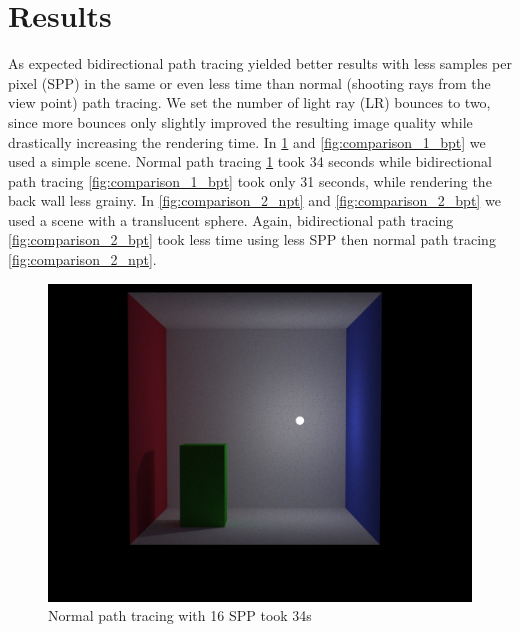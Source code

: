 \section{Results}
As expected bidirectional path tracing yielded better results with less samples per pixel (SPP) in the same or even less time than normal (shooting rays from the view point) path tracing. We set the number of light ray (LR) bounces to two, since more bounces only slightly improved the resulting image quality while drastically increasing the rendering time. In \ref{fig:comparison_1_npt} and \ref{fig:comparison_1_bpt} we used a simple scene. Normal path tracing \ref{fig:comparison_1_npt} took 34 seconds while bidirectional path tracing \ref{fig:comparison_1_bpt} took only 31 seconds, while rendering the back wall less grainy. In \ref{fig:comparison_2_npt} and \ref{fig:comparison_2_bpt} we used a scene with a translucent sphere. Again, bidirectional path tracing \ref{fig:comparison_2_bpt} took less time using less SPP then normal path tracing \ref{fig:comparison_2_npt}.

\begin{figure}[htbp]
  \centering
     \includegraphics[width=\textwidth]{pics/1_normal_pt_16spp_34s.jpg}
  \caption{Normal path tracing with 16 SPP took 34s}
  \label{fig:comparison_1_npt}
\end{figure}


